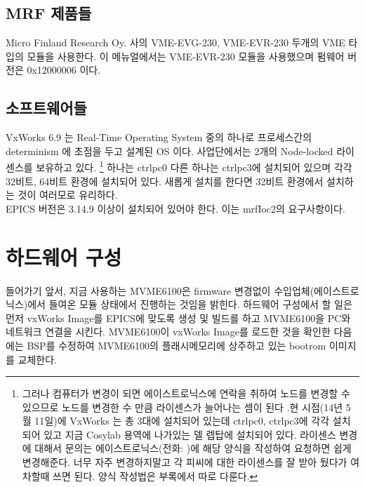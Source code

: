 \documentclass[11pt,a4paper]{article}
\begin{document}
\subsection{MRF 제품들}
Micro Finland Research Oy. 사의 VME-EVG-230, VME-EVR-230 두개의 VME 타입의 모듈을 사용한다.
이 메뉴얼에서는 VME-EVR-230 모듈을 사용했으며 펌웨어 버전은 0x12000006 이다.

\subsection{소프트웨어들}
VxWorks 6.9 는 Real-Time Operating System 중의 하나로 프로세스간의 determinism 에 초점을 두고 설계된 OS 이다.
사업단에서는 2개의 Node-locked 라이센스를 보유하고 있다.
\footnote{그러나 컴퓨터가 변경이 되면 에이스트로닉스에 연락을 취하여 노드를 변경할 수 있으므로 노드를 변경한 수 
만큼 라이센스가 늘어나는 셈이 된다 .현 시점(14년 5월 11일)에 VxWorks 는 총 3대에 설치되어 있는데 
ctrlpc0, ctrlpc3에 각각 설치되어 있고 지금 Cosylab 용역에 나가있는 델 렙탑에 설치되어 있다. 
라이센스 변경에 대해서 문의는 에이스트로닉스(전화: )에 해당 양식을 작성하여 요청하면
쉽게 변경해준다. 너무 자주 변경하지말고 각 피씨에 대한 라이센스를 잘 받아 뒀다가 여차할때 쓰면 된다.
양식 작성법은 부록에서 따로 다룬다.}
하나는 ctrlpc0 다른 하나는 ctrlpc3에 설치되어 있으며 각각 32비트, 64비트 환경에 설치되어 있다. 
새롭게 설치를 한다면 32비트 환경에서 설치하는 것이 여러모로 유리하다. \\

EPICS 버전은 3.14.9 이상이 설치되어 있어야 한다. 이는 mrfIoc2의 요구사항이다.

\section{하드웨어 구성}
들어가기 앞서, 지금 사용하는 MVME6100은 firmware 변경없이 수입업체(에이스트로닉스)에서 들여온 모듈 상태에서 진행하는 것임을 밝힌다.
하드웨어 구성에서 할 일은 먼저 vxWorks Image를 EPICS에 맞도록 생성 및 빌드를 하고 MVME6100을 PC와 네트워크 연결을 시킨다. 
MVME6100이 vxWorks Image를 로드한 것을 확인한 다음에는 BSP를 수정하여 MVME6100의 플래시메모리에 상주하고 있는 bootrom 이미지를 
교체한다.
\end{document}
